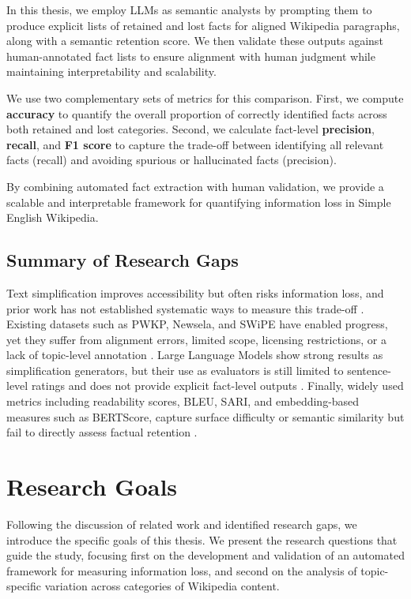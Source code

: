 \documentclass{DESSThesis}
\begin{document}
In this thesis, we employ LLMs as semantic analysts by prompting them to produce explicit lists of retained and lost facts for aligned Wikipedia paragraphs, along with a semantic retention score. We then validate these outputs against human-annotated fact lists to ensure alignment with human judgment while maintaining interpretability and scalability.

We use two complementary sets of metrics for this comparison. First, we compute \textbf{accuracy} to quantify the overall proportion of correctly identified facts across both retained and lost categories. Second, we calculate fact-level \textbf{precision}, \textbf{recall}, and \textbf{F1 score} to capture the trade-off between identifying all relevant facts (recall) and avoiding spurious or hallucinated facts (precision).

By combining automated fact extraction with human validation, we provide a scalable and interpretable framework for quantifying information loss in Simple English Wikipedia.

\section{Summary of Research Gaps}
Text simplification improves accessibility but often risks information loss, and prior work has not established systematic ways to measure this trade-off \cite{trienes2024infolossqacharacterizingrecoveringinformation, agrawal2024text}. Existing datasets such as PWKP, Newsela, and SWiPE have enabled progress, yet they suffer from alignment errors, limited scope, licensing restrictions, or a lack of topic-level annotation \cite{zhu2010monolingual,xu-etal-2015-problems,saggion2022text,laban2023swipedatasetdocumentlevelsimplification}. Large Language Models show strong results as simplification generators, but their use as evaluators is still limited to sentence-level ratings and does not provide explicit fact-level outputs \cite{liu2025evaluation,wu2025indepthevaluationlargelanguage}. Finally, widely used metrics including readability scores, BLEU, SARI, and embedding-based measures such as BERTScore, capture surface difficulty or semantic similarity but fail to directly assess factual retention \cite{tanprasert-kauchak-2021-flesch,papineni2002bleu,xu-etal-2015-problems, zhang2019bertscore,cripwell2024evaluating}.

\chapter{Research Goals}
Following the discussion of related work and identified research gaps, we introduce the specific goals of this thesis. We present the research questions that guide the study, focusing first on the development and validation of an automated framework for measuring information loss, and second on the analysis of topic-specific variation across categories of Wikipedia content.
\end{document}
